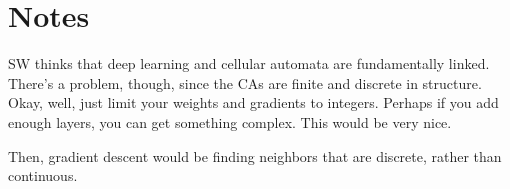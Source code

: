 \documentclass[11pt]{article}
\theoremstyle{definition}
\begin{document}
\section{Notes}

SW thinks that deep learning and cellular automata are fundamentally linked. There's a problem, though, since the CAs are finite and discrete in structure. Okay, well, just limit your weights and gradients to integers. Perhaps if you add enough layers, you can get something complex. This would be very nice.

Then, gradient descent would be finding neighbors that are discrete, rather than continuous.
\end{document}
